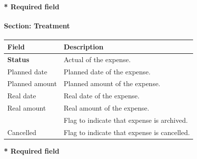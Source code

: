 \documentclass[letterpaper,10pt,english]{sphinxmanual}
\begin{document}
\textbf{* Required field}
\newpage\paragraph{Section: Treatment}

\begin{tabulary}{\linewidth}{|l|l|}
\hline
\textsf{\relax 
Field
} & \textsf{\relax 
Description
}\\
\hline
\textbf{Status}
 & 
Actual {\hyperref[Glossary:term-status]{\emph{}}} of the expense.
\\
\hline
Planned date
 & 
Planned date of the expense.
\\
\hline
Planned amount
 & 
Planned amount of the expense.
\\
\hline
Real date
 & 
Real date of the expense.
\\
\hline
Real amount
 & 
Real amount of the expense.
\\
\hline
{\hyperref[Glossary:term-closed]{\emph{}}}
 & 
Flag to indicate that expense is archived.
\\
\hline
Cancelled
 & 
Flag to indicate that expense is cancelled.
\\
\hline\end{tabulary}


\textbf{* Required field}
\end{document}
